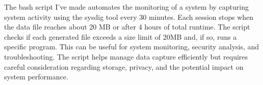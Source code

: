 The bash script I've made automates the monitoring of a system by capturing system activity using the sysdig tool every 30 minutes. Each session stops when the data file reaches about 20 MB or after 4 hours of total runtime. The script checks if each generated file exceeds a size limit of 20MB and, if so, runs a specific program. This can be useful for system monitoring, security analysis, and troubleshooting. The script helps manage data capture efficiently but requires careful consideration regarding storage, privacy, and the potential impact on system performance.

